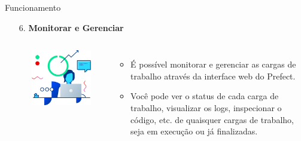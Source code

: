 \documentclass[t,serif]{beamer}
\begin{document}
	\begin{frame}{Funcionamento}
		\begin{enumerate}
			\item[6.] \textbf{Monitorar e Gerenciar}
			\begin{columns}
					\\
					\begin{center}
						\includegraphics[width=\linewidth]{figs/2_6.png}
					\end{center}
					\\
					\begin{itemize}
						\item É possível monitorar e gerenciar as cargas de trabalho através da interface web do Prefect.
						\item Você pode ver o status de cada carga de trabalho, visualizar os logs, inspecionar o código, etc. de quaisquer cargas de trabalho, seja em execução ou já finalizadas.
					\end{itemize}
			\end{columns}
		\end{enumerate}
	\end{frame}
	
\end{document}
